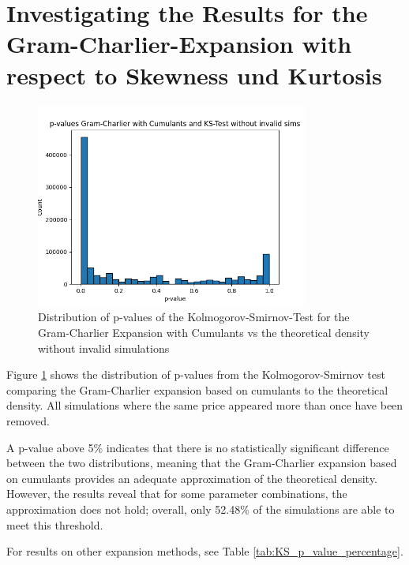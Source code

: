 \section{Investigating the Results for the Gram-Charlier-Expansion with respect to Skewness und Kurtosis}

\begin{figure}
    \centering
    \includegraphics[width=0.8\textwidth]{img/GC_cum_KS_p_value_histogram.png}
    \caption{Distribution of p-values of the Kolmogorov-Smirnov-Test for the Gram-Charlier Expansion with Cumulants vs the theoretical density without invalid simulations}
    \label{fig:GC_cum_KS_p_value_histogram}
\end{figure}

Figure \ref{fig:GC_cum_KS_p_value_histogram} shows the distribution of p-values from the Kolmogorov-Smirnov test comparing the Gram-Charlier expansion based on cumulants to the theoretical density. All simulations where the same price appeared more than once have been removed.

A p-value above 5\% indicates that there is no statistically significant difference between the two distributions, meaning that the Gram-Charlier expansion based on cumulants provides an adequate approximation of the theoretical density. However, the results reveal that for some parameter combinations, the approximation does not hold; overall, only 52.48\% of the simulations are able to meet this threshold.

For results on other expansion methods, see Table \ref{tab:KS_p_value_percentage}.

